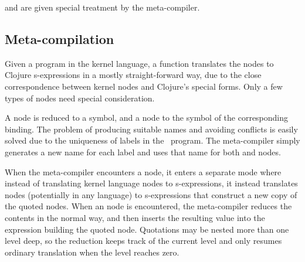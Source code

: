  and  are given special treatment by the meta-compiler.


\subsection{Meta-compilation}
Given a program in the kernel language, a function  translates the nodes to Clojure s-expressions in a mostly straight-forward way, due to the close correspondence between kernel nodes and Clojure's special forms. Only a few types of nodes need special consideration. %


A  node is reduced to a symbol, and a  node to the symbol of the corresponding binding. The problem of producing suitable names and avoiding conflicts is easily solved due to the uniqueness of labels in the \Meta\ program. The meta-compiler simply generates a new name for each label and uses that name for both  and  nodes.

When the meta-compiler encounters a  node, it enters a separate mode where instead of translating kernel language nodes to s-expressions, it instead translates nodes (potentially in any language) to s-expressions that construct a new copy of the quoted nodes. When an  node is encountered, the meta-compiler reduces the contents in the normal way, and then inserts the resulting value into the expression building the quoted node. Quotations may be nested more than one level deep, so the reduction keeps track of the current level and only resumes ordinary translation when the level reaches zero.


